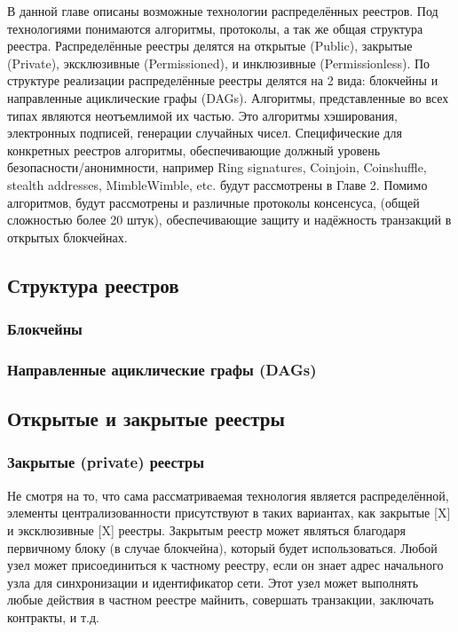 В данной главе описаны возможные технологии распределённых реестров. Под
технологиями понимаются алгоритмы, протоколы, а так же общая структура реестра.
Распределённые реестры делятся на открытые (Public), закрытые (Private),
эксклюзивные (Permissioned), и инклюзивные (Permissionless).
По структуре реализации распределённые реестры делятся на 2 вида: блокчейны и
направленные ациклические графы (DAGs). Алгоритмы, представленные во всех типах
являются неотъемлимой их частью. Это алгоритмы хэширования, электронных
подписей, генерации случайных чисел. Специфические для конкретных реестров
алгоритмы, обеспечивающие должный уровень безопасности/анонимности, например
Ring signatures, Coinjoin, Coinshuffle, stealth addresses, MimbleWimble, etc.
будут рассмотрены в Главе 2. Помимо алгоритмов, будут рассмотрены и различные
протоколы консенсуса, (общей сложностью более 20 штук), обеспечивающие защиту и
надёжность транзакций в открытых блокчейнах.

\subsection{Структура реестров}
\subsubsection{Блокчейны}
\subsubsection{Направленные ациклические графы (DAGs)}


\subsection{Открытые и закрытые реестры}
\subsubsection{Закрытые (private) реестры}
Не смотря на то, что сама рассматриваемая технология является распределённой,
элементы централизованности присутствуют в таких вариантах, как закрытые [X] и
эксклюзивные [X] реестры. Закрытым реестр может являться благодаря первичному
блоку (в случае блокчейна), который будет использоваться. Любой узел может
присоединиться к частному реестру, если он знает адрес начального узла
для синхронизации и идентификатор сети. Этот узел может выполнять
любые действия в частном реестре майнить, совершать транзакции, заключать
контракты, и т.д.

